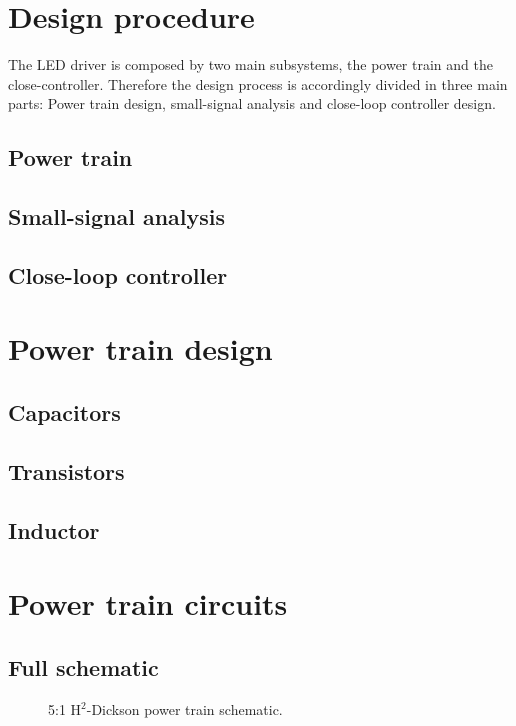 \section{Design procedure}
The LED driver is composed by two main subsystems, the power train and the close-controller. Therefore the design process is accordingly  divided in three main parts: Power train design, small-signal analysis and close-loop controller design. 


\subsection{Power train}




\subsection{Small-signal analysis}

\subsection{Close-loop controller}


\section{Power train design}
\subsection{Capacitors}
\subsection{Transistors}
\subsection{Inductor}

\section{Power train circuits}
\subsection{Full schematic}
\begin{figure}[!h]
\centering

\caption[Power train schematic]{5:1 H$^2$-Dickson power train schematic.}
\label{fig:pwr_train_sch}
\end{figure}

